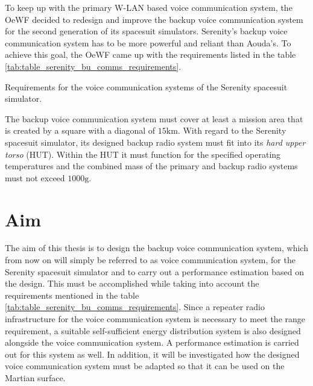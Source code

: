 To keep up with the primary W-LAN based voice communication system, the OeWF decided to redesign and improve the backup voice communication system for the second generation of its spacesuit simulators. Serenity's backup voice communication system has to be more powerful and reliant than Aouda's. To achieve this goal, the OeWF came up with the requirements listed in the table \ref{tab:table_serenity_bu_comms_requirements}.
\begin{table}[h!]
	\centering
	
	\caption{Requirements for the voice communication systems of the Serenity spacesuit simulator.}
	\label{tab:table_serenity_bu_comms_requirements}
\end{table}

The backup voice communication system must cover at least a mission area that is created by a square with a diagonal of $15\mathrm{km}$. With regard to the Serenity spacesuit simulator, its designed backup radio system must fit into its \emph{hard upper torso} (HUT). Within the HUT it must function for the specified operating temperatures and the combined mass of the primary and backup radio systems must not exceed $1000\mathrm{g}$. 

\section{Aim}
The aim of this thesis is to design the backup voice communication system, which from now on will simply be referred to as voice communication system, for the Serenity spacesuit simulator and to carry out a performance estimation based on the design. This must be accomplished while taking into account the requirements mentioned in the table \ref{tab:table_serenity_bu_comms_requirements}. Since a repeater radio infrastructure for the voice communication system is necessary to meet the range requirement, a suitable self-sufficient energy distribution system is also designed alongside the voice communication system. A performance estimation is carried out for this system as well. In addition, it will be investigated how the designed voice communication system must be adapted so that it can be used on the Martian surface.

